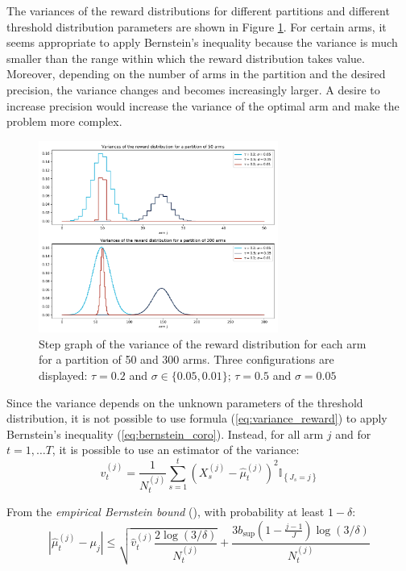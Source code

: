 \documentclass{statsmsc}
\begin{document}
The variances of the reward distributions for different partitions and different threshold distribution parameters are shown in Figure \ref{fig:variance-reward}. For certain arms, it seems appropriate to apply Bernstein's inequality because the variance is much smaller than the range within which the reward distribution takes value.
Moreover, depending on the number of arms in the partition and the desired precision, the variance changes and becomes increasingly larger.
A desire to increase precision would increase the variance of the optimal arm and make the problem more complex.
\begin{figure}[htbp]
  \centering
  \includegraphics[width=0.7\textwidth]{images/variance_rew_partitions.pdf}
  \caption{Step graph of the variance of the reward distribution for each arm for a partition of 50 and 300 arms. Three configurations are displayed: $\tau = 0.2$ and $\sigma \in \{0.05, 0.01\}$; $\tau = 0.5$ and $\sigma = 0.05$}
  \label{fig:variance-reward}
\end{figure}

Since the variance depends on the unknown parameters of the threshold distribution, it is not possible to use formula (\ref{eq:variance_reward}) to apply Bernstein's inequality (\ref{eq:bernstein_coro}). Instead, for all arm $j$ and for $t = 1, \dots T$, it is possible to use an estimator of the variance:
\[
\hat{v}_t^{(j)} = \frac{1}{N_t^{(j)}}\sum_{s=1}^{t}\left(X_s^{(j)}- \hat{\mu}_t^{(j)}\right)^2 \mathbb{I}_{\left\{J_s = j\right\}}
\]

From the \textit{empirical Bernstein bound} (\cite{mnih:hal-00834983}), with probability at least $1 - \delta$:
\begin{equation}
  \left|\hat{\mu}_t^{(j)} - \mu_j\right| \leq  \sqrt{\hat{v}_t^{(j)}\frac{2\log(3/\delta)}{N_t^{(j)}}} + \frac{3 b_{\sup}\left(1 - \frac{j-1}{J}\right) \log(3/\delta)}{N_t^{(j)}}
  \label{eq:empirical_bernstein}
\end{equation}
\end{document}
